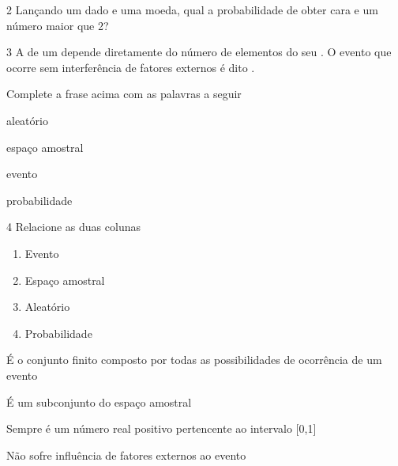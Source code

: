 \num{2} Lançando um dado e uma moeda, qual a probabilidade de obter cara e um
número maior que 2?

\begin{emptybox}
\end{emptybox}

\num{3} A  de um
 depende diretamente do número de
elementos do seu . O evento que ocorre
sem interferência de fatores externos é dito
.

Complete a frase acima com as palavras a seguir

\begin{multicols}{2}
aleatório

espaço amostral

evento

probabilidade
\end{multicols}

\num{4} Relacione as duas colunas

\begin{multicols}{2}
\begin{enumerate}
\item Evento 
\item Espaço amostral 
\item Aleatório 
\item Probabilidade 
\end{enumerate}
\end{multicols}

\begin{boxlist} 
 É o conjunto finito composto por todas as possibilidades de ocorrência de um evento

 É um subconjunto do espaço amostral

 Sempre é um número real positivo pertencente ao intervalo {[}0,1{]}

 Não sofre influência de fatores externos ao evento
\end{boxlist}

